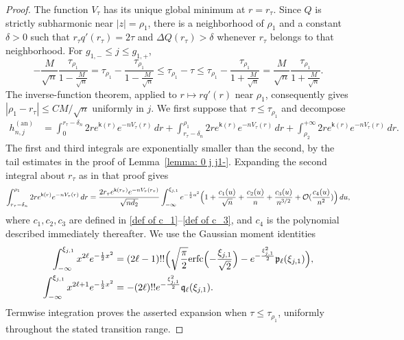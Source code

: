 \documentclass[a4paper]{article}
\numberwithin{equation}{section}
\begin{document}
\begin{proof}
The function $V_\tau$ has its unique global minimum at $r=r_\tau$. Since $Q$ is strictly subharmonic near $|z|=\rho_1$, there is a neighborhood of $\rho_1$ and a constant $\delta>0$ such that $r_\tau q'(r_\tau)=2\tau$ and $\Delta Q(r_\tau)>\delta$ whenever $r_\tau$ belongs to that neighborhood. For $g_{1,-}\leq j\leq g_{1,+}$,
\[
-\frac{M}{\sqrt{n}}\frac{\tau_{\rho_1}}{1-\frac{M}{\sqrt{n}}}
=
\tau_{\rho_1}-\frac{\tau_{\rho_1}}{1-\frac{M}{\sqrt{n}}}
\leq
\tau_{\rho_1}-\tau\leq \tau_{\rho_1}-\frac{\tau_{\rho_1}}{1+\frac{M}{\sqrt{n}}}=\frac{M}{\sqrt{n}}\frac{\tau_{\rho_1}}{1+\frac{M}{\sqrt{n}}}.
\]
The inverse-function theorem, applied to $r\mapsto rq'(r)$ near $\rho_1$, consequently gives
$|\rho_1-r_\tau|\leq CM/\sqrt n$ uniformly in $j$. We first suppose that $\tau\leq\tau_{\rho_1}$ and decompose
\begin{align*}
h_{n,j}^{(\mathrm{an})}
&=\int_{0}^{r_{\tau}-\delta_n}2re^{\mathsf{k}(r)}e^{-nV_{\tau}(r)}\,dr
+\int_{r_{\tau}-\delta_n}^{\rho_1}2re^{\mathsf{k}(r)}e^{-nV_{\tau}(r)}\,dr
+\int_{\rho_2}^{+\infty}2re^{\mathsf{k}(r)}e^{-nV_{\tau}(r)}\,dr. 
\end{align*}
The first and third integrals are exponentially smaller than the second, by the tail estimates in the proof of Lemma~\ref{lemma: 0 j j1-}. Expanding the second integral about $r_\tau$ as in that proof gives
\[
\int_{r_{\tau}-\delta_n}^{\rho_1}2re^{\mathsf{k}(r)}e^{-nV_{\tau}(r)}\,dr
=
\frac{2r_{\tau}e^{\mathsf{k}(r_{\tau})}e^{-nV_{\tau}(r_{\tau})}}{\sqrt{nd_2}}
\int_{-\infty}^{\xi_{j,1}}
e^{-\frac{1}{2}u^2}
\Bigl( 
1+\frac{c_1(u)}{\sqrt{n}}+\frac{c_2(u)}{n}+\frac{c_3(u)}{n^{3/2}}+\mathcal{O}(\frac{c_4(u)}{n^2})
\Bigr)\,du,
\]
where $c_1,c_2,c_3$ are defined in \eqref{def of c_1}--\eqref{def of c_3}, and $c_4$ is the polynomial described immediately thereafter. We use the Gaussian moment identities
\begin{align*}
\int_{-\infty}^{\xi_{j,1}}x^{2\ell}e^{-\frac{1}{2}x^2}
&=(2\ell-1)!!\Bigl(\sqrt{\frac{\pi}{2}}\mathrm{erfc}\Bigl(-\frac{\xi_{j,1}}{\sqrt{2}}\Bigr)
-e^{-\frac{\xi_{j,1}^2}{2}}
\mathfrak{p}_{\ell}(\xi_{j,1})\Bigr),
\\
\int_{-\infty}^{\xi_{j,1}}x^{2\ell+1}e^{-\frac{1}{2}x^2}
&=
-(2\ell)!!e^{-\frac{\xi_{j,1}^2}{2}}\mathfrak{q}_{\ell}(\xi_{j,1}). 
\end{align*}
Termwise integration proves the asserted expansion when $\tau\leq\tau_{\rho_1}$, uniformly throughout the stated transition range.


\end{proof}
\end{document}
